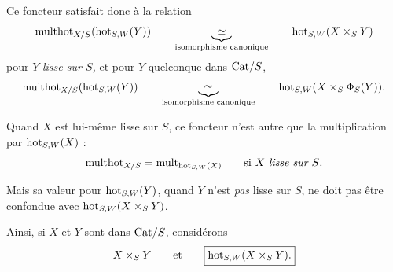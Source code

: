 Ce foncteur satisfait donc à la relation
\[\multhot_{X/S}(\hot_{S,W}(Y))\qquad\underbrace{\ \simeq\ }_{\text{isomorphisme canonique}}\qquad\hot_{S,W}(X\times_S Y)\]
pour $Y$ \textit{lisse sur $S$,} et pour $Y$ quelconque dans $\mathrm{Cat}/S$,
\[\multhot_{X/S}(\hot_{S,W}(Y))\qquad\underbrace{\ \simeq\ }_{\text{isomorphisme canonique}}\qquad\hot_{S,W}(X\times_S \Phi_S(Y)).\]

Quand $X$ est lui-même lisse sur $S$, ce foncteur n'est autre que la multiplication par $\mathrm{hot}_{S,W}(X)$ :
\[\mathrm{multhot}_{X/S}=\mathrm{mult}_{\mathrm{hot}_{S,W}(X)}\qquad\text{si $X$ \textit{lisse sur $S$.}}\]

Mais sa valeur pour $\mathrm{hot}_{S,W}(Y)$, quand $Y$ n'est \textit{pas} lisse sur $S$, ne doit pas être confondue avec $\mathrm{hot}_{S,W}(X\times_S Y)$.

Ainsi, si $X$ et $Y$ sont dans $\mathrm{Cat}/S$, considérons
\[X\times_S Y\qquad\text{et}\qquad\boxed{\mathrm{hot}_{S,W}(X\times_S Y).}\] %

